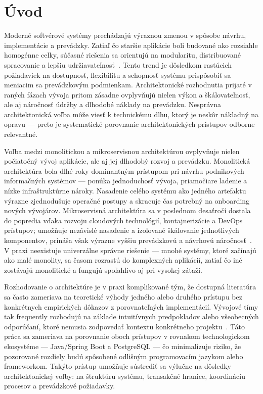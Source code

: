 \chapter{Úvod}\label{ch:introduction}

Moderné softvérové systémy prechádzajú výraznou zmenou v spôsobe návrhu, implementácie a prevádzky. Zatiaľ čo staršie aplikácie boli budované ako rozsiahle homogénne celky, súčasné riešenia sa orientujú na modularitu, distribuované spracovanie a lepšiu udržiavateľnosť~\cite{Newman2021,Richardson2018}. Tento trend je dôsledkom rastúcich požiadaviek na dostupnosť, flexibilitu a schopnosť systému prispôsobiť sa meniacim sa prevádzkovým podmienkam. Architektonické rozhodnutia prijaté v raných fázach vývoja pritom zásadne ovplyvňujú nielen výkon a škálovateľnosť, ale aj náročnosť údržby a dlhodobé náklady na prevádzku. Nesprávna architektonická voľba môže viesť k technickému dlhu, ktorý je neskôr nákladný na opravu — preto je systematické porovnanie architektonických prístupov odborne relevantné.

Voľba medzi monolitickou a mikroservisnou architektúrou ovplyvňuje nielen počiatočný vývoj aplikácie, ale aj jej dlhodobý rozvoj a prevádzku. Monolitická architektúra bola dlhé roky dominantným prístupom pri návrhu podnikových informačných systémov — ponúka jednoduchosť vývoja, priamočiare ladenie a nízke infraštruktúrne nároky. Nasadenie celého systému ako jedného artefaktu výrazne zjednodušuje operačné postupy a skracuje čas potrebný na onboarding nových vývojárov. Mikroservisná architektúra sa v poslednom desaťročí dostala do popredia vďaka rozvoju cloudových technológií, kontajnerizácie a DevOps prístupov; umožňuje nezávislé nasadenie a izolované škálovanie jednotlivých komponentov, prináša však výrazne vyššiu prevádzkovú a návrhovú náročnosť~\cite{Newman2021,Richardson2018,FowlerLewis2014MicroservicesDefinition}. V praxi neexistuje univerzálne správne riešenie — mnohé systémy, ktoré začínajú ako malé monolity, sa časom rozrastú do komplexných aplikácií, zatiaľ čo iné zostávajú monolitické a fungujú spoľahlivo aj pri vysokej záťaži.

Rozhodovanie o architektúre je v praxi komplikované tým, že dostupná literatúra sa často zameriava na teoretické výhody jedného alebo druhého prístupu bez konkrétnych empirických dôkazov z porovnateľných implementácií. Vývojové tímy tak frequently rozhodujú na základe intuitívnych predpokladov alebo všeobecných odporúčaní, ktoré nemusia zodpovedať kontextu konkrétneho projektu~\cite{Newman2021,Richardson2018}. Táto práca sa zameriava na porovnanie oboch prístupov v rovnakom technologickom ekosystéme — Java/Spring Boot a PostgreSQL — čo minimalizuje riziko, že pozorované rozdiely budú spôsobené odlišným programovacím jazykom alebo frameworkom. Takýto prístup umožňuje sústrediť sa výlučne na dôsledky architektonickej voľby: na štruktúru systému, transakčné hranice, koordináciu procesov a prevádzkové požiadavky.

